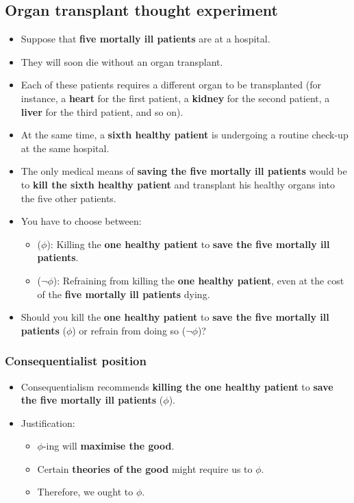 \documentclass[11pt]{article}
\begin{document}
\subsection{Organ transplant thought experiment}
\label{sec:org31317ea}
\begin{itemize}
\item Suppose that \textbf{five mortally ill patients} are at a hospital.
\item They will soon die without an organ transplant.
\item Each of these patients requires a different organ to be transplanted (for instance, a \textbf{heart} for the first patient, a \textbf{kidney} for the second patient, a \textbf{liver} for the third patient, and so on).
\item At the same time, a \textbf{sixth healthy patient} is undergoing a routine check-up at the same hospital.
\item The only medical means of \textbf{saving the five mortally ill patients} would be to \textbf{kill the sixth healthy patient} and transplant his healthy organs into the five other patients.
\item You have to choose between:
\begin{itemize}
\item (\(\phi\)): Killing the \textbf{one healthy patient} to \textbf{save the five mortally ill patients}.
\item (\(\neg \phi\)): Refraining from killing the \textbf{one healthy patient}, even at the cost of the \textbf{five mortally ill patients} dying.
\end{itemize}
\item Should you kill the \textbf{one healthy patient} to \textbf{save the five mortally ill patients} (\(\phi\)) or refrain from doing so (\(\neg \phi\))?
\end{itemize}
\subsubsection{Consequentialist position}
\label{sec:orgcaea3f4}
\begin{itemize}
\item Consequentialism recommends \textbf{killing the one healthy patient} to \textbf{save the five mortally ill patients} (\(\phi\)).
\item Justification:
\begin{itemize}
\item \(\phi\)-ing will \textbf{maximise the good}.
\item Certain \textbf{theories of the good} might require us to \(\phi\).
\item Therefore, we ought to \(\phi\).
\end{itemize}
\end{itemize}
\end{document}
